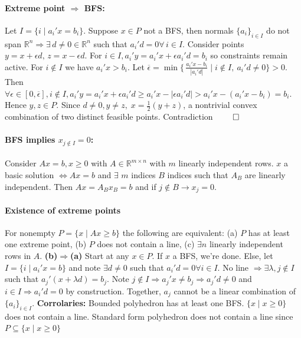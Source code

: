 \documentclass{article}
\newcommand{\abs}[1]{\lvert#1\rvert}
\begin{document}
\paragraph{Extreme point $\Rightarrow$ BFS:} Let $I=\{i \mid a_i'x = b_i\}$. Suppose $x\in P$ not a BFS, then normals $\{a_i\}_{i\in I}$ do not span $\mathbb R^n \Longrightarrow \exists\, d \neq 0 \in\mathbb R^n$ such that $a_i'd = 0 \forall\,i \in I$. 
Consider points $y = x + \epsilon d,\, z=x - \epsilon d$. For $i\in I, a_i'y = a_i'x + \epsilon a_i'd = b_i$ so constraints remain active. For $i\notin I$ we have $a_i'x > b_i$. 
Let $\overline \epsilon =  \min\Big\{\,\tfrac{a_i' x-b_i}{\,|a_i' d|\,}\mid i\notin I,\ a_i' d\neq 0\Big\} > 0$.
Then $\forall \epsilon \in [0, \overline \epsilon], i \notin I, a_i'y = a_i'x + \epsilon a_i'd \geq a_i'x - \abs{\epsilon a_i'd} > a_i'x - (a_i'x - b_i) = b_i$. Hence $y,z\in P$. 
Since $d \neq 0, y\neq z,\; x = \frac{1}{2}(y + z)$, a nontrivial convex combination of two distinct feasible points. Contradiction $\qed$ 

\paragraph{BFS implies $x_{j \notin I} = 0$:} Consider $Ax = b, x\geq 0$ with $A\in \mathbb R^{m\times n}$ with $m$ linearly independent rows. $x$ a basic solution $\iff Ax = b$ and $\exists$ $m$ indices $B$ indices such that $A_B$ are linearly independent. Then $Ax = A_Bx_B = b$ and if $j \notin B \rightarrow x_j = 0$.

\paragraph{Existence of extreme points} For nonempty $P = \{x \mid Ax \geq b\}$ the following are equivalent: (a) $P$ has at least one extreme point, (b) $P$ does not contain a line, (c) $\exists n$ linearly independent rows in $A$. \textbf{(b)$\Rightarrow$(a)} Start at any $x\in P$. If $x$ a BFS, we're done. Else, let $I = \{i \mid a_i'x = b\}$ and note $\exists d \neq 0$ such that $a_i'd = 0\forall i \in I$.
No line $\Rightarrow \exists \lambda, j\notin I$ such that $a_j'(x + \lambda d) = b_j$. Note $j\notin I \Rightarrow a_j'x \neq b_j \Rightarrow a_j'd \neq 0$ and $i\in I \Rightarrow a_i'd = 0$ by construction. 
Together, $a_j$ cannot be a linear combination of $\{a_i\}_{i\in I}$. 
\textbf{Corrolaries:} Bounded polyhedron has at least one BFS. $\{x \mid x \geq 0\}$ does not contain a line. Standard form polyhedron does not contain a line since $P\subseteq \{x \mid x \geq 0\}$
\end{document}
